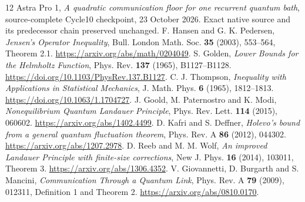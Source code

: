 \documentclass[11pt]{article}
\begin{document}
\begingroup\small
\begin{thebibliography}{12}
 Astra Pro 1, \emph{A quadratic communication floor for one
recurrent quantum bath}, source-complete Cycle10 checkpoint, 23 October 2026.
Exact native source and its predecessor chain preserved unchanged.
 F. Hansen and G. K. Pedersen, \emph{Jensen's Operator Inequality},
Bull. London Math. Soc. \textbf{35} (2003), 553--564, Theorem 2.1.
\url{https://arxiv.org/abs/math/0204049}.
 S. Golden, \emph{Lower Bounds for the Helmholtz Function},
Phys. Rev. \textbf{137} (1965), B1127--B1128.
\url{https://doi.org/10.1103/PhysRev.137.B1127}.
 C. J. Thompson, \emph{Inequality with Applications in
Statistical Mechanics}, J. Math. Phys. \textbf{6} (1965), 1812--1813.
\url{https://doi.org/10.1063/1.1704727}.
 J. Goold, M. Paternostro and K. Modi,
\emph{Nonequilibrium Quantum Landauer Principle},
Phys. Rev. Lett. \textbf{114} (2015), 060602.
\url{https://arxiv.org/abs/1402.4499}.
 D. Kafri and S. Deffner, \emph{Holevo's bound from a general
quantum fluctuation theorem}, Phys. Rev. A \textbf{86} (2012), 044302.
\url{https://arxiv.org/abs/1207.2978}.
 D. Reeb and M. M. Wolf, \emph{An improved Landauer Principle
with finite-size corrections}, New J. Phys. \textbf{16} (2014), 103011,
Theorem 3. \url{https://arxiv.org/abs/1306.4352}.
 V. Giovannetti, D. Burgarth and S. Mancini,
\emph{Communication Through a Quantum Link},
Phys. Rev. A \textbf{79} (2009), 012311, Definition 1 and Theorem 2.
\url{https://arxiv.org/abs/0810.0170}.
\end{thebibliography}
\endgroup
\end{document}

